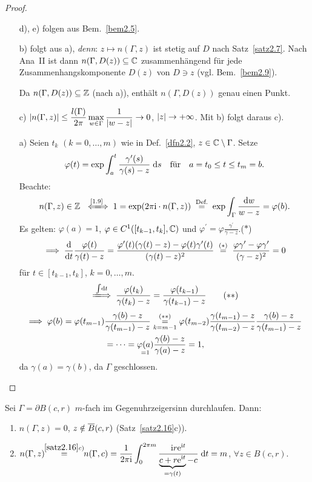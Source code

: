\documentclass[a4paper,twoside,DIV15,BCOR12mm]{scrbook}
\begin{document}
\begin{proof}\begin{itemize}
\item[d),]e) folgen aus Bem.~\ref{bem2.5}.

\item[b)] folgt aus a), \textit{denn}: $z\mapsto n(\Gamma,z)$ ist stetig auf $D$ nach Satz~\ref{satz2.7}. Nach Ana~II ist dann $n(\Gamma,D(z))\subseteq\mathbb{C}$ zusammenhängend für jede Zusammenhangskomponente $D(z)$ von $D\ni z$ (vgl. Bem.~\ref{bem2.9}).

Da $n(\Gamma,D(z))\subseteq\mathbb{Z}$ (nach a)), enthält $n(\Gamma,D(z))$ genau einen Punkt.

\item[c)] $\displaystyle\left\lvert n(\Gamma,z)\right\lvert\leq\frac{l(\Gamma)}{2\pi}\max_{w\in\Gamma}\frac{1}{\left\lvert w-z\right\lvert}\rightarrow 0$, $\left\lvert z\right\lvert\rightarrow+\infty$. Mit b) folgt daraus c).

\item[a)] Seien $t_k$ $(k=0,\dotsc,m)$ wie in Def.~\ref{dfn2.2}, $z\in\mathbb{C}\setminus\Gamma$. Setze 
\[\varphi(t) = \exp\int_{a}^{t}{\frac{\gamma^\prime(s)}{\gamma(s)-z}}\;\mathrm{d} s\quad\text{für}\quad a = t_0\leq t\leq t_m = b.\]
Beachte:
\[n(\Gamma,z)\in\set{Z}\gdwnach{\eqref{1.9}} 1 = \exp(2\pi\i\cdot n(\Gamma,z)) \nach{=}{Def.} \exp\int_\Gamma\frac{\d w}{w-z} = \varphi(b).\]
Es gelten: $\varphi(a) = 1$, $\varphi\in C^1([t_{k-1},t_k],\mathbb{C})$ und $\varphi^\prime = \varphi\frac{\gamma^\prime}{\gamma-z}$.\hfill($*$)
\[\folgt \frac{\d}{\d t}\frac{\varphi(t)}{\gamma(t) - z} = \frac{\varphi^\prime(t)(\gamma(t)-z)-\varphi(t)\gamma^\prime(t)}{(\gamma(t)-z)^2} \wegen{=}{(*)} \frac{\varphi\gamma^\prime-\varphi\gamma^\prime}{(\gamma-z)^2} = 0\]
für $t\in[t_{k-1},t_k]$, $k=0,\dotsc,m$.
\[\folgtwegen{\int\!\d t}\frac{\varphi(t_k)}{\gamma(t_k)-z} = \frac{\varphi(t_{k-1})}{\gamma(t_{k-1})-z}\tag{$**$}\]
\begin{align*}
\implies\varphi(b)=\varphi(t_{m-1})&\frac{\gamma(b)-z}{\gamma(t_{m-1})-z} \overset{(**)}{\underset{k=m-1}{=}} \varphi(t_{m-2})\frac{\gamma(t_{m-1})-z}{\gamma(t_{m-2})-z}\frac{\gamma(b)-z}{\gamma(t_{m-1})-z}\\& = \dotsb = \underset{=1}{\varphi(a)}\frac{\gamma(b)-z}{\gamma(a)-z} = 1,
\end{align*}
da $\gamma(a) = \gamma(b)$, da $\Gamma$ geschlossen.\qedhere
\end{itemize}
\end{proof}

\begin{bsp}\label{bsp2.17}
Sei $\Gamma = \partial B(c,r)$ $m$-fach im Gegenuhrzeigersinn durchlaufen. Dann:
\begin{enumerate}
\item $n(\Gamma,z) = 0$, $z\notin \overline{B}(c,r)$ (Satz~\ref{satz2.16}c)).
\item $\displaystyle n(\Gamma,z)\!\! \overset{\ref{satz2.16}c)}{=}\!\! n(\Gamma,c) = \frac{1}{2\pi\mathrm{i}}\int_{0}^{2\pi m}{\frac{\mathrm{i} r\mathrm{e}^{\mathrm{i} t}}{\underbrace{c+r\mathrm{e}^{\mathrm{i} t}}_{=\gamma(t)}-c}}\;\mathrm{d} t = m$, $\forall z\in B(c,r)$.
\end{enumerate}
\end{bsp}
\end{document}
